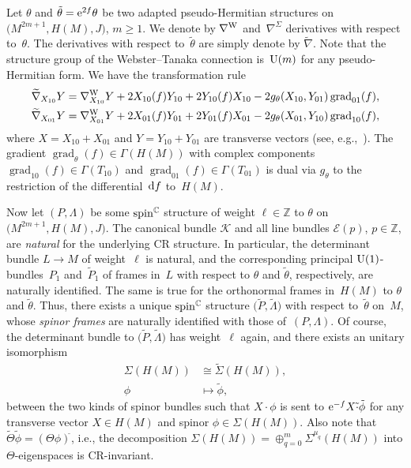 \documentclass[pdftex]{sigma}
\numberwithin{equation}{section}
\newcommand{\ZZ}{\mathbb{Z}}
\newcommand{\CC}{\mathbb{C}}
\begin{document}
Let $\theta$ and $\tilde{\theta}= {\rm e}^{2f}\theta$ be two adapted pseudo-Hermitian structures on $\big(M^{2m+1},H(M),J\big)$, $m\geq 1$.
We denote by $\nabla^{\rm W}$ and~$\nabla^\Sigma$ derivatives with respect to~$\theta$.
The derivatives with respect to~$\tilde{\theta}$ are simply denote by $\widetilde{\nabla}$.
Note that the structure group of the Webster--Tanaka connection is~${\rm U}(m)$ for any pseudo-Hermitian form.
We have the transformation rule
\begin{gather}
\widetilde{\nabla}_{X_{10}}Y = \nabla^{\rm W}_{X_{10}}Y + 2X_{10}(f)Y_{10} + 2Y_{10}(f)X_{10} - 2g_\theta(X_{10},Y_{01})\operatorname{grad}_{01}(f),\nonumber\\
\widetilde{\nabla}_{X_{01}}Y = \nabla^{\rm W}_{X_{01}}Y + 2X_{01}(f)Y_{01} + 2Y_{01}(f)X_{01}- 2g_\theta(X_{01},Y_{10})\operatorname{grad}_{10}(f),\label{traflaw1}
\end{gather}
where $X=X_{10}+X_{01}$ and $Y=Y_{10}+Y_{01}$ are transverse vectors (see, e.g.,~\cite{Lee}). The gradient $\operatorname{grad}_\theta(f)\in \Gamma(H(M))$ with complex components
 $\operatorname{grad}_{10}(f)\in\Gamma(T_{10})$ and $\operatorname{grad}_{01}(f)\in\Gamma(T_{01})$
is dual via $g_\theta$ to the restriction of the differential~${\rm d}f$ to~$H(M)$.

Now let $(P,\Lambda)$ be some ${\rm spin}^\CC$ structure of weight $\ell\in\ZZ$ to $\theta$ on $\big(M^{2m+1},H(M),J\big)$.
The canonical bundle $\mathcal{K}$ and all line bundles $\mathcal{E}(p)$, $p\in\ZZ$, are {\em natural} for the underlying
CR structure. In particular, the determinant bundle $L\to M$ of weight~$\ell$ is natural, and the corresponding principal ${\rm U}(1)$-bundles~$P_1$ and~$\tilde{P}_1$
of frames in~$L$ with respect to $\theta$ and $\tilde{\theta}$, respectively, are naturally identified.
The same is true for the orthonormal frames in~$H(M)$ to $\theta$ and $\tilde{\theta}$.
Thus, there exists a unique ${\rm spin}^\CC$ structure $\big(\tilde{P},\tilde{\Lambda}\big)$ with respect to~$\tilde{\theta}$
on~$M$, whose {\em spinor frames} are naturally identified with those of~$(P,\Lambda)$.
Of course, the determinant bundle to $\big(\tilde{P},\tilde{\Lambda}\big)$ has weight~$\ell$ again, and there exists
an unitary isomorphism
\begin{align*}
\Sigma(H(M))&\cong \widetilde{\Sigma}(H(M)),\\
\phi&\mapsto \tilde{\phi},
\end{align*}
between the two kinds of spinor bundles such that
$X\cdot\phi$ is sent to ${\rm e}^{-f}X \tilde{\cdot} \tilde{\phi}$ for any transverse vector $X\in H(M)$ and spinor $\phi\in \Sigma(H(M))$.
Also note that $\widetilde{\Theta}\tilde{\phi}=(\Theta\phi)^{\widetilde{}}$, i.e., the decomposition $\Sigma(H(M))=\oplus_{q=0}^m \Sigma^{\mu_q}(H(M))$
into $\Theta$-eigenspaces is CR-invariant.
\end{document}
